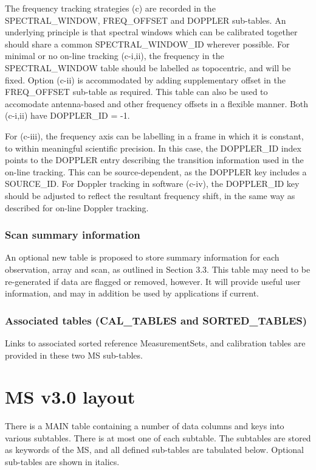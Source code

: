 \documentclass{article}
\begin{document}
The frequency tracking strategies (c) are recorded in the
SPECTRAL\_WINDOW, FREQ\_OFFSET and DOPPLER sub-tables. An underlying
principle is that spectral windows which can be calibrated together
should share a common SPECTRAL\_WINDOW\_ID wherever possible. For
minimal or no on-line tracking (c-i,ii), the frequency in the
SPECTRAL\_WINDOW table should be labelled as topocentric, and will be
fixed. Option (c-ii) is accommodated by adding supplementary offset in
the FREQ\_OFFSET sub-table as required. This table can also be used to
accomodate antenna-based and other frequency offsets in a flexible
manner. Both (c-i,ii) have DOPPLER\_ID = -1.

For (c-iii), the frequency axis can be labelling in a frame in which
it is constant, to within meaningful scientific precision. In this
case, the DOPPLER\_ID index points to the DOPPLER entry describing the
transition information used in the on-line tracking. This can be
source-dependent, as the DOPPLER key includes a SOURCE\_ID. For
Doppler tracking in software (c-iv), the DOPPLER\_ID key should be
adjusted to reflect the resultant frequency shift, in the same way
as described for on-line Doppler tracking.

\subsubsection{Scan summary information}

An optional new table is proposed to store summary information for
each observation, array and scan, as outlined in Section 3.3. This
table may need to be re-generated if data are flagged or removed,
however. It will provide useful user information, and may in addition
be used by applications if current.

\subsubsection{Associated tables (CAL\_TABLES and SORTED\_TABLES)}

Links to associated sorted reference MeasurementSets, and calibration
tables are provided in these two MS sub-tables.

\section{MS v3.0 layout}

There is a MAIN table containing a number of data columns and keys
into various subtables. There is at most one of each subtable. The
subtables are stored as keywords of the MS, and all defined sub-tables
are tabulated below.  Optional sub-tables are shown in italics.
\end{document}
